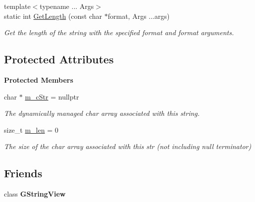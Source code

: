 \begin{Indent}
\begin{DoxyCompactItemize}
\mbox{\label{classrev_1_1_g_string_a08b9195980caea3d7f5f140c9a24b4cd}} 
{\footnotesize template$<$typename ... Args$>$ }\\static int \mbox{\hyperlink{classrev_1_1_g_string_a08b9195980caea3d7f5f140c9a24b4cd}{Get\+Length}} (const char $\ast$format, Args ...args)
\begin{DoxyCompactList}\small\item\em Get the length of the string with the specified format and format arguments. \end{DoxyCompactList}\end{DoxyCompactItemize}
\end{Indent}
\subsection*{Protected Attributes}
\begin{Indent}\textbf{ Protected Members}\par
\begin{DoxyCompactItemize}
\item 
\mbox{\label{classrev_1_1_g_string_a7d2d86ac714f5dc7a2ab2a1f355c03c6}} 
char $\ast$ \mbox{\hyperlink{classrev_1_1_g_string_a7d2d86ac714f5dc7a2ab2a1f355c03c6}{m\+\_\+c\+Str}} = nullptr
\begin{DoxyCompactList}\small\item\em The dynamically managed char array associated with this string. \end{DoxyCompactList}\item 
\mbox{\label{classrev_1_1_g_string_ae46f14dec8db3210d881790929813559}} 
size\+\_\+t \mbox{\hyperlink{classrev_1_1_g_string_ae46f14dec8db3210d881790929813559}{m\+\_\+len}} = 0
\begin{DoxyCompactList}\small\item\em The size of the char array associated with this str (not including null terminator) \end{DoxyCompactList}\end{DoxyCompactItemize}
\end{Indent}
\subsection*{Friends}
\begin{DoxyCompactItemize}
\item 
\mbox{\label{classrev_1_1_g_string_a659282c36de29689f46a29f4fe2cb7bf}} 
class {\bfseries G\+String\+View}
\end{DoxyCompactItemize}

